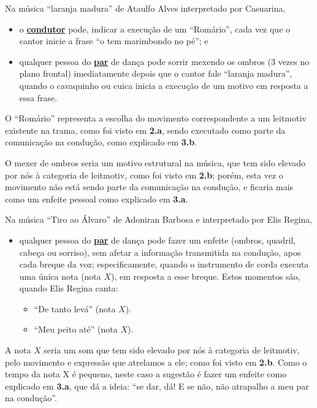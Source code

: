 \begin{example}
Na música ``laranja madura'' de Ataulfo Alves interpretado por Casuarina,
\begin{itemize}
\item  o \hyperref[def:Condutor]{\textbf{condutor}} pode, indicar a execução de um ``Romário'',
cada vez que o cantor inicie a frase ``o tem marimbondo no pé''; 
e 
\item qualquer pessoa do \hyperref[def:Par]{\textbf{par}} de dança pode sorrir 
mexendo os ombros (3 vezes no plano frontal) imediatamente depois que o cantor fale ``laranja madura'',
quando o cavaquinho ou cuica inicia a execução de um motivo em resposta a essa frase.
\end{itemize}

O ``Romário'' representa a escolha do movimento correspondente a um leitmotiv existente na trama,
como foi visto em \textbf{2.a}, sendo executado como parte da comunicação na condução, como explicado em \textbf{3.b}.

O mexer de ombros seria um motivo estrutural na música, que tem sido elevado por nós à categoria de leitmotiv,
como foi visto em \textbf{2.b}; porém, esta vez o movimento não está sendo parte da comunicação na condução,
e ficaria mais como um enfeite pessoal como explicado em \textbf{3.a}.

\end{example}

\begin{example}
\label{ex:leitmotiftiroalvaro}
Na música ``Tiro ao Álvaro'' de Adoniran Barbosa e interpretado  por Elis Regina,
\begin{itemize}
\item qualquer pessoa do \hyperref[def:Par]{\textbf{par}} de dança pode fazer um enfeite (ombros, quadril, cabeça ou sorriso),
sem afetar a informação transmitida na condução, apos cada breque da voz;
especificamente, quando o instrumento de corda executa uma única nota (nota $X$), em resposta a esse breque.
Estos momentos são, quando Elis Regina canta: 
\begin{itemize}
\item ``De tanto levá'' (nota $X$).
\item ``Meu peito até'' (nota $X$).
\end{itemize}
\end{itemize}
A nota $X$ seria um som que tem sido elevado por nós à categoria de leitmotiv,
pelo movimento e expressão que atrelamos a ele;
como foi visto em \textbf{2.b}. 
Como o tempo da nota X é pequeno, neste caso a sugestão é fazer um enfeite como explicado em \textbf{3.a},
que dá a ideia: ``se dar, dá! E se não, não atrapalho a meu par na condução''.

\end{example}


